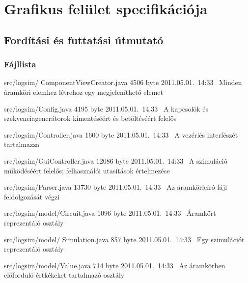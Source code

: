%
\chapter{Grafikus felület specifikációja}

\thispagestyle{fancy}

\section{Fordítási és futtatási útmutató}

\subsection{Fájllista}

\begin{fajllista}

\fajl
{src/logsim/\newline
ComponentViewCreator.java} %
{4506 byte} %
{2011.05.01.~14:33~} %
{Minden áramköri elemhez létrehoz egy megjeleníthető elemet} %

\fajl
{src/logsim/Config.java} %
{4195 byte} %
{2011.05.01.~14:33~} %
{A kapcsolók és szekvenciagenerátorok kimentéséért és betöltéséért felelős} %

\fajl
{src/logsim/Controller.java} %
{1600 byte} %
{2011.05.01.~14:33~} %
{A vezérlés interfészét tartalmazza} %

\fajl
{src/logsim/GuiController.java} %
{12086 byte} %
{2011.05.01.~14:33~} %
{A szimuláció működéséért felelős; felhasználói utasítások értelmezése} %

\fajl
{src/logsim/Parser.java} %
{13730 byte} %
{2011.05.01.~14:33~} %
{Az áramkörleíró fájl feldolgozását végzi} %

\fajl
{src/logsim/model/Circuit.java} %
{1096 byte} %
{2011.05.01.~14:33~} %
{Áramkört reprezentáló osztály} %

\fajl
{src/logsim/model/\newline
Simulation.java} %
{857 byte} %
{2011.05.01.~14:33~} %
{Egy szimulációt reprezentáló osztály} %

\fajl
{src/logsim/model/Value.java} %
{714 byte} %
{2011.05.01.~14:33~} %
{Az áramkörben előforduló értkékeket tartalmazó osztály} %


\end{fajllista}
